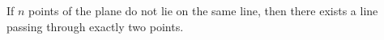 If $n$ points of the plane do not lie on the same line, then there exists a line passing through exactly two points.
